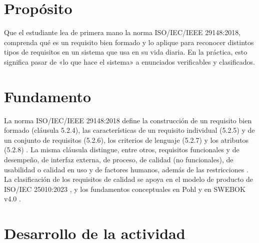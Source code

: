 \documentclass[11pt]{article}
\newcommand{\seccion}[1]{\section{\textcolor{utegreendk}{#1}}}
\begin{document}
\seccion{Propósito}

Que el estudiante lea de primera mano la norma ISO/\allowbreak{}IEC/\allowbreak{}IEEE 29148:2018, comprenda qué es un requisito bien formado y lo aplique para reconocer distintos tipos de requisitos en un sistema que usa en su vida diaria. En la práctica, esto significa pasar de «lo que hace el sistema» a enunciados verificables y clasificados.

\seccion{Fundamento}

La norma ISO/\allowbreak{}IEC/\allowbreak{}IEEE 29148:2018 define la construcción de un requisito bien formado (cláusula 5.2.4), las características de un requisito individual (5.2.5) y de un conjunto de requisitos (5.2.6), los criterios de lenguaje (5.2.7) y los atributos (5.2.8) \citep{iso29148_2018}. La misma cláusula distingue, entre otros, requisitos funcionales y de desempeño, de interfaz externa, de proceso, de calidad (no funcionales), de usabilidad o calidad en uso y de factores humanos, además de las restricciones \citep{iso29148_2018}. La clasificación de los requisitos de calidad se apoya en el modelo de producto de ISO/\allowbreak{}IEC 25010:2023 \citep{iso25010_2023}, y los fundamentos conceptuales en Pohl \citep{pohl_2025} y en SWEBOK v4.0 \citep{swebok_v4_2024}.

\seccion{Desarrollo de la actividad}
\end{document}
